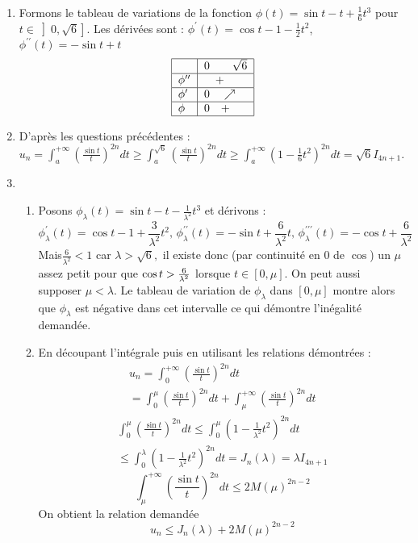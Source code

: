 \begin{enumerate}
\item  Formons le tableau de variations de la fonction $\phi (t)=\sin t-t+%
\frac{1}{6}t^{3}$ pour $t\in \left] 0,\sqrt{6}\right] $. Les
d\'{e}riv\'{e}es sont : $\phi ^{\prime }(t)=\cos t-1-\frac{1}{2}t^{2}$, $%
\phi ^{\prime \prime }(t)=-\sin t+t$%
\[
\begin{tabular}{|l|l|}
\hline
& $0\qquad \sqrt{6}$ \\ \hline
$\phi ^{\prime \prime }$ & $\quad +$ \\ \hline
$\phi ^{\prime }$ & $0\quad \nearrow $ \\ \hline
$\phi $ & $0\quad +$ \\ \hline
\end{tabular}
\]

\item  D'apr\`{e}s les questions pr\'{e}c\'{e}dentes : $u_{n}=\int_{a}^{+%
\infty }\left( \frac{\sin t}{t}\right) ^{2n}dt\geq \int_{a}^{\sqrt{6}}\left( 
\frac{\sin t}{t}\right) ^{2n}dt\geq \int_{a}^{+\infty }\left( 1-\frac{1}{6}%
t^{2}\right) ^{2n}dt=\sqrt{6}I_{4n+1}$.

\item 
\begin{enumerate}
\item  Posons $\phi _{\lambda }(t)=\sin t-t-\frac{1}{\lambda ^{2}}t^{3}$ et
d\'{e}rivons : 
\[
\phi _{\lambda }^{\prime }(t)=\cos t-1+\frac{3}{\lambda ^{2}}t^{2}\text{, }%
\phi _{\lambda }^{\prime \prime }(t)=-\sin t+\frac{6}{\lambda ^{2}}t\text{, }%
\phi _{\lambda }^{\prime \prime \prime }(t)=-\cos t+\frac{6}{\lambda ^{2}} 
\]
Mais$\frac{6}{\lambda ^{2}}<1$ car $\lambda >\sqrt{6},$ il existe donc (par
continuit\'{e} en 0 de $\cos $) un $\mu $ assez petit pour que $\cos t>\frac{%
6}{\lambda ^{2}}$ lorsque $t\in \left[ 0,\mu \right] .$ On peut aussi
supposer $\mu <\lambda $. Le tableau de variation de $\phi _{\lambda }$ dans 
$\left[ 0,\mu \right] $ montre alors que $\phi _{\lambda }$ est n\'{e}gative
dans cet intervalle ce qui d\'{e}montre l'in\'{e}galit\'{e} demand\'{e}e.

\item  En d\'{e}coupant l'int\'{e}grale puis en utilisant les relations
d\'{e}montr\'{e}es : 
\begin{multline*}
u_{n} = \int_{0}^{+\infty }\left( \frac{\sin t}{t}\right)^{2n}dt\\
=\int_{0}^{\mu }\left( \frac{\sin t}{t}\right) ^{2n}dt + \int_{\mu
}^{+\infty }\left( \frac{\sin t}{t}\right) ^{2n}dt
\end{multline*}
\begin{multline*}
\int_{0}^{\mu }\left( \frac{\sin t}{t}\right) ^{2n}dt
 \leq \int_{0}^{\mu}\left( 1-\frac{1}{\lambda ^{2}}t^{2}\right) ^{2n}dt \\
\leq \int_{0}^{\lambda}\left( 1-\frac{1}{\lambda ^{2}}t^{2}\right) ^{2n}dt 
= J_{n}(\lambda ) = \lambda I_{4n+1}
\end{multline*}
\begin{displaymath}
\int_{\mu }^{+\infty }\left( \frac{\sin t}{t}\right) ^{2n}dt 
\leq 2M(\mu)^{2n-2}
\end{displaymath}
On obtient la relation demand\'{e}e 
\[
u_{n}\leq J_{n}(\lambda )+2M(\mu )^{2n-2} 
\]
\end{enumerate}


\end{enumerate}
